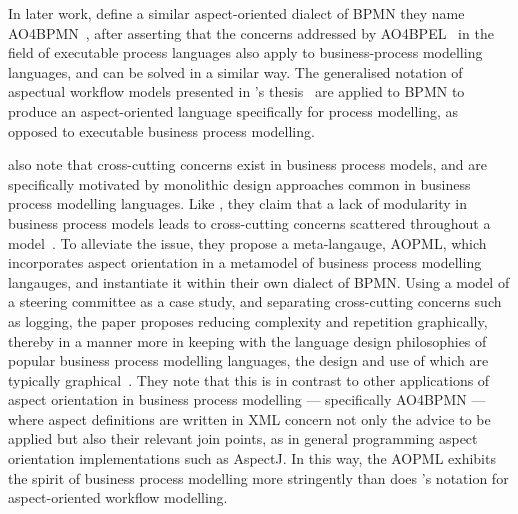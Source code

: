 In later work, \citeauthor{charfi2010AO4BPMN} define a similar aspect-oriented
dialect of BPMN they name AO4BPMN~\cite{charfi2010AO4BPMN}, after asserting that
the concerns addressed by
AO4BPEL~\cite{Charfi2006AspectOrientedWL,charfi2007ao4bpel} in the field of
executable process languages also apply to business-process modelling languages,
and can be solved in a similar way. The generalised notation of aspectual
workflow models presented in \citeauthor{Charfi2006AspectOrientedWL}'s
thesis~\cite{Charfi2006AspectOrientedWL} are applied to BPMN to produce an
aspect-oriented language specifically for process modelling, as opposed to
executable business process modelling.

 also note that cross-cutting concerns exist in
business process models, and are specifically motivated by monolithic design
approaches common in business process modelling languages. Like
\citeauthor{kiczales1997aspect}, they claim that a lack of modularity in
business process models leads to cross-cutting concerns scattered throughout a
model~\cite{Cappelli_AOBPM}. To alleviate the issue, they propose a
meta-langauge, AOPML, which incorporates aspect orientation in a metamodel of
business process modelling langauges, and instantiate it within their own
dialect of BPMN. Using a model of a steering committee as a case study, and
separating cross-cutting concerns such as logging, the paper proposes reducing
complexity and repetition graphically, thereby in a manner more in keeping with
the language design philosophies of popular business process modelling
languages, the design and use of which are typically
graphical~\cite{OMG-BPMN-SPEC,opm_original,OMG-UML-SPEC}. They note that this is
in contrast to other applications of aspect orientation in business process
modelling --- specifically AO4BPMN --- where aspect definitions are written in
XML concern not only the advice to be applied but also their relevant join
points, as in general programming aspect orientation implementations such as
AspectJ. In this way, the AOPML exhibits the spirit of business process
modelling more stringently than does \citeauthor{Charfi2006AspectOrientedWL}'s
notation for aspect-oriented workflow modelling.

